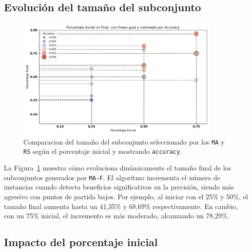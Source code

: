 \subsection{Evolución del tamaño del subconjunto}

\begin{figure}[htp]
    \centering
    \includegraphics[width=0.9\textwidth]{imagenes/evaluaciones/painting/scatter-por-porcentaje.png}
    \caption{Comparacion del tamaño del subconjunto seleccionado por los \texttt{MA} y \texttt{RS} según el porcentaje inicial y mostrando \texttt{accuracy}.}
    \label{fig:scatter-painting}
\end{figure}

La Figura~\ref{fig:scatter-painting} muestra cómo evoluciona dinámicamente el tamaño final de los subconjuntos generados por \texttt{MA-F}.
El algoritmo incrementa el número de instancias cuando detecta beneficios significativos en la precisión, siendo más agresivo con puntos de partida bajos.
Por ejemplo, al iniciar con el 25\% y 50\%, el tamaño final aumenta hasta un 41,35\% y 68,69\% respectivamente.
En cambio, con un 75\% inicial, el incremento es más moderado, alcanzando un 78,29\%.

\subsection{Impacto del porcentaje inicial}

